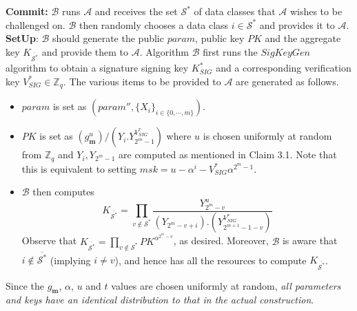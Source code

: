 \noindent \textbf{Commit:} $\mathcal{B}$ runs $\mathcal{A}$ and receives the set ${\mathcal{S}}^{*}$ of data classes that $\mathcal{A}$ wishes to be challenged on. $\mathcal{B}$ then randomly chooses a data class $i\in{\mathcal{S}}^{*}$ and provides it to $\mathcal{A}$.\\
 
\noindent \textbf{SetUp}: $\mathcal{B}$ should generate the public $param$, public key $PK$ and the aggregate key $K_{\overline{{\mathcal{S}}^{*}}}$ and provide them to $\mathcal{A}$. Algorithm $\mathcal{B}$ first runs the $SigKeyGen$ algorithm to obtain a signature signing key $K^{*}_{SIG}$ and a corresponding verification key $V^{*}_{SIG} \in \mathbb{Z}_q$. The various items to be provided to $\mathcal{A}$ are generated as follows.
\begin{itemize}
  \item $param$ is set as $(param'',\{X_i\}_{i\in\{0,\cdots,m\}})\nonumber$.
  \item $PK$ is set as $\left({g^u_{\mathbf{m}}}\right)/{\left(Y_i.Y^{V^{*}_{SIG}}_{2^m-1}\right)}$ where $u$ is chosen uniformly at random from $\mathbb{Z}_q$ and $Y_i,Y_{2^m-1}$ are computed as mentioned in Claim 3.1. Note that this is equivalent to setting $msk=u-\alpha^i-V^{*}_{SIG}\alpha^{2^m-1}$.
  \item $\mathcal{B}$ then computes   
  \begin{equation}
   K_{\overline{{\mathcal{S}}^{*}}} = \prod_{v\notin{\mathcal{S}}^{*}}\frac{Y^{u}_{2^m-v}}{(Y_{2^m-v+i}).(Y^{V^{*}_{SIG}}_{2^{m+1}-1-v})}\nonumber
  \end{equation}
  \noindent Observe that $K_{\overline{{\mathcal{S}}^{*}}}=\prod_{v\notin{\mathcal{S}}^{*}}PK^{\alpha^{2^m-v}}$, as desired. Moreover, $\mathcal{B}$ is aware that $i\notin \overline{{\mathcal{S}}^{*}}$ (implying $i\neq v$), and hence has all the resources to compute $K_{\overline{{\mathcal{S}}^{*}}}$.  
\end{itemize}
 
\noindent Since the $g_{\mathbf{m}}$, $\alpha$, $u$ and $t$ values are chosen uniformly at random, \emph{all parameters and keys have an identical distribution to that in the actual construction}.\\

